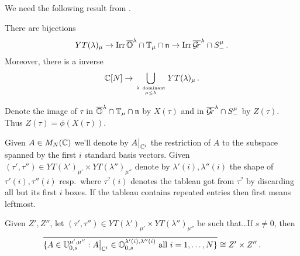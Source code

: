 \documentclass[draft]{article}
\begin{document}
We need the following result from \cite{dthesis}.
\begin{proposition}
    There are bijections 
    \[
        YT(\lambda)_\mu \to \operatorname{Irr} \overline{\mathbb O}^\lambda\cap\mathbb T_\mu\cap\mathfrak n \to \operatorname{Irr} \overline{\mathcal{G}\!r}^\lambda\cap S^\mu_-\,. 
    \]
    Moreover, there is a  inverse 
    \[
    \mathbb C[N]\to \bigcup_{\lambda~\text{dominant}\atop \mu\le\lambda} YT(\lambda)_\mu \,. 
    \]
\end{proposition}
% 

Denote the image of $\tau$ in $\overline{\mathbb O}^\lambda\cap\mathbb T_\mu\cap\mathfrak n$ by $X(\tau)$ and in $\overline{\mathcal{G}\!r}^\lambda\cap S^\mu_-$ by $Z(\tau)$. Thus $Z(\tau) = \phi(X(\tau))$.  

% 
% 
% 
% 
Given $A \in M_N(\mathbb C)$ we'll denote by $A\big|_{\mathbb C^i}$ the restriction of $A$ to the subspace spanned by the first $i$ standard basis vectors. Given $(\tau',\tau'')\in YT(\lambda')_{\mu'}\times YT(\lambda'')_{\mu''}$ denote by $\lambda'(i),\lambda''(i)$ the shape of $\tau'(i),\tau''(i)$ resp.\ where $\tau^?(i)$ denotes the tableau got from $\tau^?$ by discarding all but its first $i$ boxes. If the tableau contains repeated entries then first means leftmost.


\begin{proposition}
    Given $Z',Z''$, let $(\tau',\tau'')\in YT(\lambda')_{\mu'}\times YT(\lambda'')_{\mu''}$ be such that\dots If $s\ne 0$, then 
    \[
    \overline{\{A\in\UU_{0,s}^{\mu',\mu''} : A \big|_{\CC^{i}} \in \OO_{0,s}^{\lambda'(i),\lambda''(i)} \text{ all } i=1,\dots,N\}} 
    \cong Z'\times Z'' \,. %
    \]
\end{proposition}
% 
\end{document}
